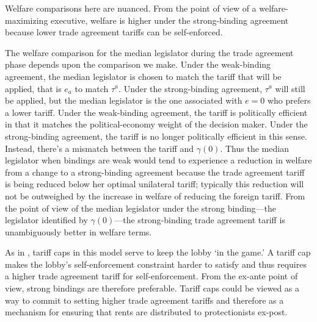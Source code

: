 \documentclass[authoryear, review]{elsarticle}
\newcommand{\ga}{\gamma}
\begin{document}
Welfare comparisons here are nuanced. From the point of view of a welfare-maximizing executive, welfare is higher under the strong-binding agreement because lower trade agreement tariffs can be self-enforced.

The welfare comparison for the median legislator during the trade agreement phase depends upon the comparison we make. Under the weak-binding agreement, the median legislator is chosen to match the tariff that will be applied, that is $e_a$ to match $\tau^a$. Under the strong-binding agreement, $\tau^a$ will still be applied, but the median legislator is the one associated with $e=0$ who prefers a lower tariff. Under the weak-binding agreement, the tariff is politically efficient in that it matches the political-economy weight of the decision maker. Under the strong-binding agreement, the tariff is no longer politically efficient in this sense. Instead, there's a mismatch between the tariff and $\ga(0)$. Thus the median legislator when bindings are weak would tend to experience a reduction in welfare from a change to a strong-binding agreement because the trade agreement tariff is being reduced below her optimal unilateral tariff; typically this reduction will not be outweighed by the increase in welfare of reducing the foreign tariff. From the point of view of the median legislator under the strong binding---the legislator identified by $\ga(0)$---the strong-binding trade agreement tariff is unambiguously better in welfare terms.

As in \citet{mrc2007}, tariff caps in this model serve to keep the lobby `in the game.' A tariff cap makes the lobby's self-enforcement constraint harder to satisfy and thus requires a higher trade agreement tariff for self-enforcement. From the ex-ante point of view, strong bindings are therefore preferable. Tariff caps could be viewed as a way to commit to setting higher trade agreement tariffs and therefore as a mechanism for ensuring that rents are distributed to protectionists ex-post.
\end{document}
